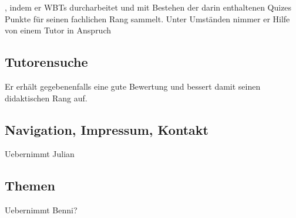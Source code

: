 \begin{k}
, indem er WBTs durcharbeitet und mit Bestehen
der darin enthaltenen Quizes Punkte für seinen fachlichen Rang sammelt. Unter
Umständen nimmer er Hilfe von einem Tutor in Anspruch
\end{k}
\subsection{Tutorensuche}
\begin{k}
Er erhält gegebenenfalls eine gute Bewertung und
bessert damit seinen didaktischen Rang auf.
\end{k}

\subsection{Navigation, Impressum, Kontakt}
\begin{k}
Uebernimmt Julian
\end{k}

\subsection{Themen}
\begin{k}
Uebernimmt Benni?
\end{k}